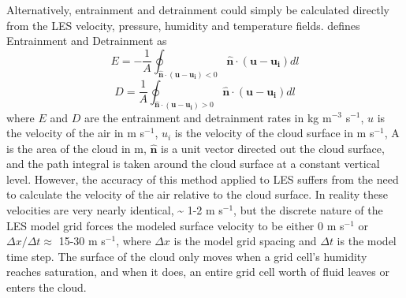 \documentclass[12pt]{article}
\begin{document}
Alternatively, entrainment and detrainment could simply be calculated directly 
from the LES velocity, pressure, humidity and temperature fields.  
\cite{Siebesma1998} defines Entrainment and Detrainment as
\begin{equation}
E = -\frac{1}{A}\oint_{\mathbf{\hat{n}}\cdot(\mathbf{u} - \mathbf{u_i}) < 0}
\mathbf{\hat{n}}\cdot(\mathbf{u}-\mathbf{u_i})dl
\end{equation}
\begin{equation}
D = \frac{1}{A}\oint_{\mathbf{\hat{n}}\cdot(\mathbf{u} - \mathbf{u_i}) > 0}
\mathbf{\hat{n}}\cdot(\mathbf{u}-\mathbf{u_i})dl
\end{equation}
where $E$ and $D$ are the entrainment and detrainment rates in kg m$^{-3}$ 
s$^{-1}$, $u$ is the velocity of the air in m s$^{-1}$, $u_i$ is the velocity 
of the cloud surface in m s$^{-1}$, A is the area of the cloud in m,
$\mathbf{\hat{n}}$ is a unit vector directed out the cloud surface, and the 
path integral is taken around the cloud surface at a constant vertical level.
However, the accuracy of this method applied to LES suffers from the need to 
calculate the velocity of the air relative to the cloud surface.  In reality 
these velocities are very nearly identical, \textasciitilde{} 1-2 m s$^{-1}$, 
but the discrete nature of the LES model grid forces the modeled surface 
velocity to be either 0 m s$^{-1}$ or $\Delta x / \Delta t \approx$ 
15-30 m s$^{-1}$, where $\Delta x$ is the model grid spacing and $\Delta t$ 
is the model time step.  The surface of the cloud only moves when a grid 
cell's humidity reaches saturation, and when it does, an entire grid cell 
worth of fluid leaves or enters the cloud.
\end{document}
